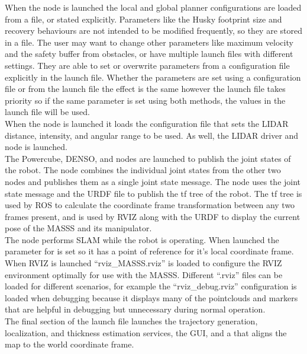 When the  node is launched the local and global planner configurations are loaded from a file, or stated explicitly. Parameters like the Husky footprint size and recovery behaviours are not intended to be modified frequently, so they are stored in a file. The user may want to change other parameters like maximum velocity and the safety buffer from obstacles, or have multiple launch files with different settings. They are able to set or overwrite parameters from a configuration file explicitly in the launch file. Whether the parameters are set using a configuration file or from the launch file the effect is the same however the launch file takes priority so if the same parameter is set using both methods, the values in the launch file will be used.\\

When the  node is launched it loads the configuration file that sets the LIDAR distance, intensity, and angular range to be used. As well, the LIDAR driver and  node is launched.\\

The Powercube, DENSO, and  nodes are launched to publish the joint states of the robot. The  node combines the individual joint states from the other two nodes and publishes them as a single joint state message. The node  uses the joint state message and the URDF file to publish the tf tree of the robot. The tf tree is used by ROS to calculate the coordinate frame transformation between any two frames present, and is used by RVIZ along with the URDF to display the current pose of the MASSS and its manipulator.\\

The node  performs SLAM while the robot is operating. When launched the parameter for  is set so it has a point of reference for it's local coordinate frame.\\

When RVIZ is launched ``rviz\_MASSS.rviz'' is loaded to configure the RVIZ environment optimally for use with the MASSS. Different ``.rviz'' files can be loaded for different scenarios, for example the ``rviz\_debug.rviz'' configuration is loaded when debugging because it displays many of the pointclouds and markers that are helpful in debugging but unnecessary during normal operation.\\

The final section of the launch file launches the trajectory generation, localization, and thickness estimation services, the  GUI, and a  that aligns the map to the world coordinate frame.\\

